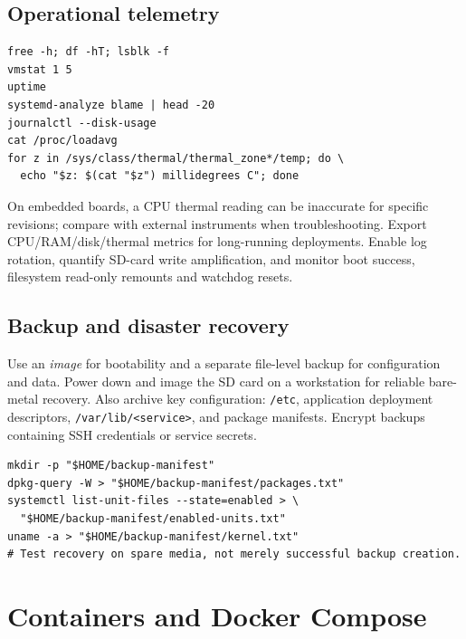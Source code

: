\documentclass[10pt,oneside,openany]{report}
\newcommand{\code}[1]{\texttt{#1}}
\begin{document}
\section{Operational telemetry}
\begin{lstlisting}[style=sh]
free -h; df -hT; lsblk -f
vmstat 1 5
uptime
systemd-analyze blame | head -20
journalctl --disk-usage
cat /proc/loadavg
for z in /sys/class/thermal/thermal_zone*/temp; do \
  echo "$z: $(cat "$z") millidegrees C"; done
\end{lstlisting}
On embedded boards, a CPU thermal reading can be inaccurate for specific revisions; compare with external instruments when troubleshooting. Export CPU/RAM/disk/thermal metrics for long-running deployments. Enable log rotation, quantify SD-card write amplification, and monitor boot success, filesystem read-only remounts and watchdog resets.
\section{Backup and disaster recovery}
Use an \emph{image} for bootability and a separate file-level backup for configuration and data. Power down and image the SD card on a workstation for reliable bare-metal recovery. Also archive key configuration: \code{/etc}, application deployment descriptors, \code{/var/lib/<service>}, and package manifests. Encrypt backups containing SSH credentials or service secrets.
\begin{lstlisting}[style=sh]
mkdir -p "$HOME/backup-manifest"
dpkg-query -W > "$HOME/backup-manifest/packages.txt"
systemctl list-unit-files --state=enabled > \
  "$HOME/backup-manifest/enabled-units.txt"
uname -a > "$HOME/backup-manifest/kernel.txt"
# Test recovery on spare media, not merely successful backup creation.
\end{lstlisting}

\chapter{Containers and Docker Compose}
\end{document}
